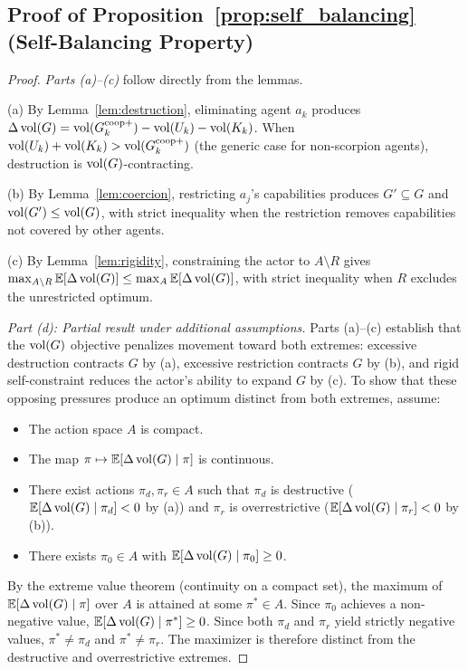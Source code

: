 
\subsection{Proof of Proposition~\ref{prop:self_balancing} (Self-Balancing Property)}
\label{app:proof_self_balancing}

\begin{proof}
\emph{Parts (a)--(c)} follow directly from the lemmas.

(a) By Lemma~\ref{lem:destruction}, eliminating agent $a_k$ produces
$\Delta \operatorname{vol}(G) = \operatorname{vol}(G^{\mathrm{coop}+}_{k}) - \operatorname{vol}(U_k) - \operatorname{vol}(K_k)$.
When $\operatorname{vol}(U_k) + \operatorname{vol}(K_k) > \operatorname{vol}(G^{\mathrm{coop}+}_{k})$ (the generic
case for non-scorpion agents), destruction is $\operatorname{vol}(G)$-contracting.

(b) By Lemma~\ref{lem:coercion}, restricting $a_j$'s capabilities produces
$G' \subseteq G$ and $\operatorname{vol}(G') \leq \operatorname{vol}(G)$, with strict inequality when the
restriction removes capabilities not covered by other agents.

(c) By Lemma~\ref{lem:rigidity}, constraining the actor to $A \setminus R$
gives $\max_{A \setminus R} \mathbb{E}[\Delta \operatorname{vol}(G)] \leq \max_A
\mathbb{E}[\Delta \operatorname{vol}(G)]$, with strict inequality when $R$ excludes the
unrestricted optimum.

\emph{Part (d): Partial result under additional assumptions.} Parts (a)--(c)
establish that the $\operatorname{vol}(G)$ objective penalizes movement toward both extremes:
excessive destruction contracts $G$ by (a), excessive restriction contracts $G$
by (b), and rigid self-constraint reduces the actor's ability to expand $G$
by (c). To show that these opposing pressures produce an optimum distinct from
both extremes, assume:
\begin{itemize}
\item The action space $A$ is compact.
\item The map $\pi \mapsto \mathbb{E}[\Delta \operatorname{vol}(G) \mid \pi]$ is continuous.
\item There exist actions $\pi_d, \pi_r \in A$ such that $\pi_d$
  is destructive ($\mathbb{E}[\Delta \operatorname{vol}(G) \mid \pi_d] < 0$ by (a)) and
  $\pi_r$ is overrestrictive ($\mathbb{E}[\Delta \operatorname{vol}(G) \mid \pi_r] < 0$
  by (b)).
\item There exists $\pi_0 \in A$ with
  $\mathbb{E}[\Delta \operatorname{vol}(G) \mid \pi_0] \geq 0$.
\end{itemize}
By the extreme value theorem (continuity on a compact set), the maximum of
$\mathbb{E}[\Delta \operatorname{vol}(G) \mid \pi]$ over $A$ is attained at some
$\pi^* \in A$. Since $\pi_0$ achieves a non-negative value,
$\mathbb{E}[\Delta \operatorname{vol}(G) \mid \pi^*] \geq 0$. Since both $\pi_d$ and
$\pi_r$ yield strictly negative values, $\pi^* \neq \pi_d$ and
$\pi^* \neq \pi_r$. The maximizer is therefore distinct from the destructive
and overrestrictive extremes.


\end{proof}
